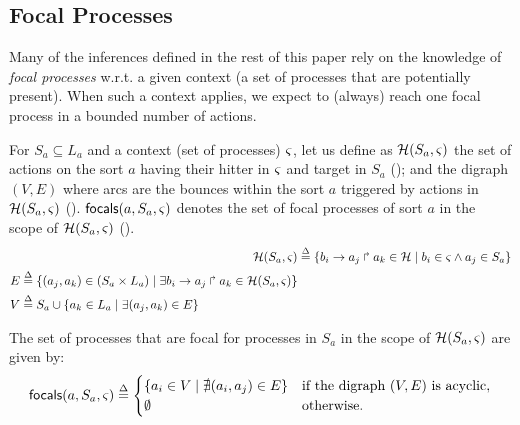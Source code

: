 \subsection{Focal Processes}\label{ssec:focal}


Many of the inferences defined in the rest of this paper rely on the knowledge of \emph{focal
processes} w.r.t. a given context (a set of processes that are potentially present).
When such a context applies, we expect to (always) reach one focal process in a bounded number of
actions.

For $S_a\subseteq L_a$ and a context (set of processes) $\varsigma$, let us define as $\mathcal{H}(S_a,\varsigma)$
the set of actions on the sort $a$ having their hitter in $\varsigma$ and target in $S_a$
();
and the digraph $(V, E)$ where arcs are the bounces within the sort $a$ triggered by actions
in $\mathcal{H}(S_a,\varsigma)$ ().
$\mathsf{focals}(a,S_a,\varsigma)$ denotes the set of focal processes of sort $a$ in the scope of
$\mathcal{H}(S_a,\varsigma)$ ().
\begin{align}
\mathcal{H}(S_a,\varsigma) & \stackrel{\Delta}= \{ b_i\rightarrow a_j\Rsh a_k\in\mathcal{H} \mid b_i\in\varsigma \wedge a_j\in S_a \}
\label{eq:PHa-ctx}
\\
\begin{split}
E  & \stackrel{\Delta}= \{(a_j,a_k)\in (S_a \times L_a) \mid 
			\exists b_i\rightarrow a_j\Rsh a_k\in \mathcal{H}(S_a,\varsigma) \}
\\
V & \stackrel{\Delta}= S_a \cup \{ a_k\in L_a\mid \exists (a_j,a_k)\in E\}
\end{split}
\label{eq:bounce-graph}
\end{align}

\begin{definition}\label{def:focals}
The set of processes that are focal for processes in $S_a$ in the scope of $\mathcal{H}(S_a,\varsigma)$
are given by:
\[
\mathsf{focals}(a,S_a,\varsigma) \stackrel{\Delta}=
\begin{cases}
\{ a_i \in V \mid \nexists (a_i,a_j)\in E\} & \text{if the digraph $(V,E)$ is acyclic},\\
\emptyset & \text{otherwise.}\\
\end{cases}
\]
\end{definition}

